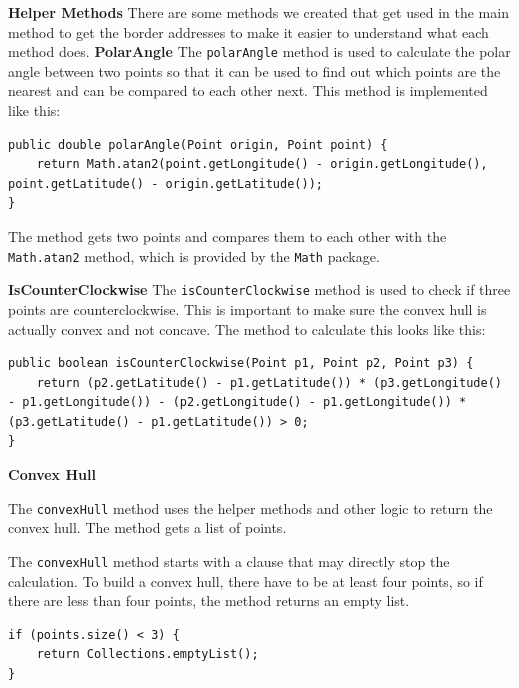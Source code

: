     \textbf{Helper Methods} \newline
    There are some methods we created that get used in the main method to get the border addresses to make it easier to understand what each method does. 
    \textbf{PolarAngle}
    The \texttt{polarAngle} method is used to calculate the polar angle between two points so that it can be used to find out which points are the nearest and can be compared to each other next. This method is implemented like this: 
    \begin{verbatim}
public double polarAngle(Point origin, Point point) {
    return Math.atan2(point.getLongitude() - origin.getLongitude(), point.getLatitude() - origin.getLatitude());
}
    \end{verbatim}
    The method gets two points and compares them to each other with the \texttt{Math.atan2} method, which is provided by the \texttt{Math} package. \newline

    \textbf{IsCounterClockwise} \newline
    The \texttt{isCounterClockwise} method is used to check if three points are counterclockwise. This is important to make sure the convex hull is actually convex and not concave. The method to calculate this looks like this: 
    \begin{verbatim}
public boolean isCounterClockwise(Point p1, Point p2, Point p3) {
    return (p2.getLatitude() - p1.getLatitude()) * (p3.getLongitude() - p1.getLongitude()) - (p2.getLongitude() - p1.getLongitude()) * (p3.getLatitude() - p1.getLatitude()) > 0;
}
    \end{verbatim}

    \textbf{Convex Hull}
    
    The \texttt{convexHull} method uses the helper methods and other logic to return the convex hull. The method gets a list of points. \newline
    
    The \texttt{convexHull} method starts with a clause that may directly stop the calculation. To build a convex hull, there have to be at least four points, so if there are less than four points, the method returns an empty list.
    \begin{verbatim}
if (points.size() < 3) {
    return Collections.emptyList();
}
    \end{verbatim}
 
